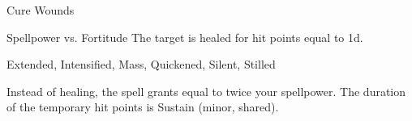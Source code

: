 \begin{spellsection}{Cure Wounds}
\begin{spellcontent}
\begin{spelltargetinginfo}
\end{spelltargetinginfo}
\begin{spelleffects}
\begin{spellattack}{Spellpower vs. Fortitude}
\spellsuccess The target is healed for hit points equal to  \plus1d.
\end{spellattack}
\end{spelleffects}
\end{spellcontent}
\begin{spellfooter}
 Extended, Intensified, Mass, Quickened, Silent, Stilled
\end{spellfooter}
\begin{spellsubcontent}
\begin{spellcantrip}
Instead of healing, the spell grants  equal to twice your spellpower.
The duration of the temporary hit points is Sustain (minor, shared).
\end{spellcantrip}
\end{spellsubcontent}
\end{spellsection}
